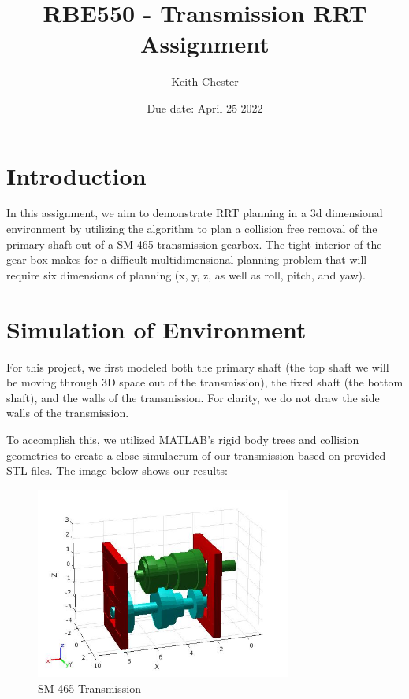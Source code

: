 \documentclass{article}
\title{RBE550 - Transmission RRT Assignment}
\author{Keith Chester}
\date{Due date: April 25 2022}
\begin{document}
\maketitle

\section*{Introduction}

In this assignment, we aim to demonstrate RRT planning in a 3d dimensional environment by utilizing the algorithm to plan a collision free removal of the primary shaft out of a SM-465 transmission gearbox. The tight interior of the gear box makes for a difficult multidimensional planning problem that will require six dimensions of planning (x, y, z, as well as roll, pitch, and yaw).

\section*{Simulation of Environment}
For this project, we first modeled both the primary shaft (the top shaft we will be moving through 3D space out of the transmission), the fixed shaft (the bottom shaft), and the walls of the transmission. For clarity, we do not draw the side walls of the transmission.

To accomplish this, we utilized MATLAB's rigid body trees and collision geometries to create a close simulacrum of our transmission based on provided STL files. The image below shows our results:

\begin{figure}[H]
    \centering
    \includegraphics[width = 0.75\textwidth]{img/start.jpg}
    \caption{SM-465 Transmission}
    \label{fig:start}
\end{figure}
\end{document}
